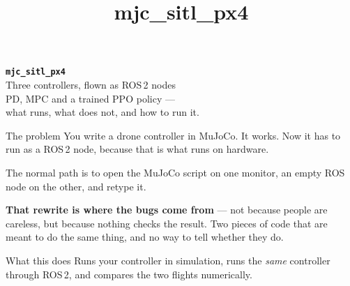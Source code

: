 \documentclass[aspectratio=169,11pt]{beamer}
\title{mjc\_sitl\_px4}
\newcommand{\cue}[1]{\textbf{\color{keyc}#1}}
\begin{document}
{
\begin{frame}
  \vspace{1.1cm}
  \begin{center}
    {\Huge\bfseries \texttt{mjc\_sitl\_px4}}\\[0.5cm]
    {\Large Three controllers, flown as ROS\,2 nodes}\\[1.0cm]
    {\large\color{dimc} PD, MPC and a trained PPO policy ---}\\[0.15cm]
    {\large\color{dimc} what runs, what does not, and how to run it.}
  \end{center}
\end{frame}}

\begin{frame}[fragile]{The problem}
  You write a drone controller in MuJoCo. It works. Now it has to run as a
  ROS\,2 node, because that is what runs on hardware.

  \vspace{0.4cm}
  The normal path is to open the MuJoCo script on one monitor, an empty ROS
  node on the other, and retype it.

  \vspace{0.4cm}
  \cue{That rewrite is where the bugs come from} --- not because people are
  careless, but because nothing checks the result. Two pieces of code that are
  meant to do the same thing, and no way to tell whether they do.

  \vspace{0.5cm}
  \begin{block}{What this does}
    Runs your controller in simulation, runs the \emph{same} controller through
    ROS\,2, and compares the two flights numerically.
  \end{block}
\end{frame}
\end{document}
